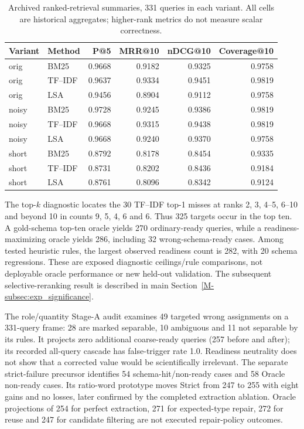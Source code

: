 \begin{table}[htbp]\centering\small
\caption{Archived ranked-retrieval summaries, 331 queries in each variant. All cells are historical aggregates; higher-rank metrics do not measure scalar correctness.}\label{tab:ranked-retrieval}
\begin{tabular}{@{}llrrrr@{}}\toprule
Variant & Method & P@5 & MRR@10 & nDCG@10 & Coverage@10\\\midrule
orig & BM25 & 0.9668 & 0.9182 & 0.9325 & 0.9758\\
orig & TF--IDF & 0.9637 & 0.9334 & 0.9451 & 0.9819\\
orig & LSA & 0.9456 & 0.8904 & 0.9112 & 0.9758\\
noisy & BM25 & 0.9728 & 0.9245 & 0.9386 & 0.9819\\
noisy & TF--IDF & 0.9668 & 0.9315 & 0.9438 & 0.9819\\
noisy & LSA & 0.9668 & 0.9240 & 0.9370 & 0.9758\\
short & BM25 & 0.8792 & 0.8178 & 0.8454 & 0.9335\\
short & TF--IDF & 0.8731 & 0.8202 & 0.8436 & 0.9184\\
short & LSA & 0.8761 & 0.8096 & 0.8342 & 0.9124\\
\bottomrule\end{tabular}\end{table}

The top-$k$ diagnostic locates the 30 TF--IDF top-1 misses at ranks 2, 3, 4--5, 6--10 and beyond 10 in counts 9, 5, 4, 6 and 6. Thus 325 targets occur in the top ten. A gold-schema top-ten oracle yields 270 ordinary-ready queries, while a readiness-maximizing oracle yields 286, including 32 wrong-schema-ready cases. Among tested heuristic rules, the largest observed readiness count is 282, with 20 schema regressions. These are exposed diagnostic ceilings/rule comparisons, not deployable oracle performance or new held-out validation. The subsequent selective-reranking result is described in main Section~\ref{M-subsec:exp_significance}.

The role/quantity Stage-A audit examines 49 targeted wrong assignments on a 331-query frame: 28 are marked separable, 10 ambiguous and 11 not separable by its rules. It projects zero additional coarse-ready queries (257 before and after); its recorded all-query cascade has false-trigger rate 1.0. Readiness neutrality does not show that a corrected value would be scientifically irrelevant. The separate strict-failure precursor identifies 54 schema-hit/non-ready cases and 58 Oracle non-ready cases. Its ratio-word prototype moves Strict from 247 to 255 with eight gains and no losses, later confirmed by the completed extraction ablation. Oracle projections of 254 for perfect extraction, 271 for expected-type repair, 272 for reuse and 247 for candidate filtering are not executed repair-policy outcomes.

